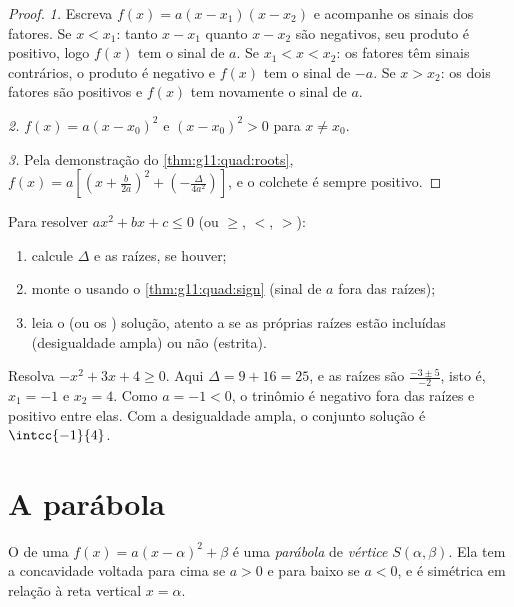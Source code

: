 \begin{proof}
\emph{1.} Escreva $f(x) = a(x-x_1)(x-x_2)$ e acompanhe os sinais dos
fatores. Se $x < x_1$: tanto $x - x_1$ quanto $x - x_2$ são negativos,
seu produto é positivo, logo $f(x)$ tem o sinal de $a$. Se
$x_1 < x < x_2$: os fatores têm sinais contrários, o produto é negativo e
$f(x)$ tem o sinal de $-a$. Se $x > x_2$: os dois fatores são positivos e
$f(x)$ tem novamente o sinal de $a$.

\emph{2.} $f(x) = a(x - x_0)^2$ e $(x-x_0)^2 > 0$ para $x \neq x_0$.

\emph{3.} Pela demonstração do \cref{thm:g11:quad:roots},
$f(x) = a\left[\left(x + \frac{b}{2a}\right)^2 +
\left(-\frac{\Delta}{4a^2}\right)\right]$, e o colchete é sempre
positivo.
\end{proof}

\begin{method}\label{met:g11:quad:inequalities}
Para resolver $ax^2 + bx + c \leq 0$ (ou $\geq$, $<$, $>$):
\begin{enumerate}
  \item calcule $\Delta$ e as raízes, se houver;
  \item monte o  usando o \cref{thm:g11:quad:sign} (sinal
        de $a$ fora das raízes);
  \item leia o  (ou os ) solução, atento a se as
        próprias raízes estão incluídas (desigualdade ampla) ou não
        (estrita).
\end{enumerate}
\end{method}

\begin{example}\label{ex:g11:quad:inequality}
Resolva $-x^2 + 3x + 4 \geq 0$. Aqui $\Delta = 9 + 16 = 25$, e as raízes
são $\frac{-3 \pm 5}{-2}$, isto é, $x_1 = -1$ e $x_2 = 4$. Como
$a = -1 < 0$, o trinômio é negativo fora das raízes e positivo entre
elas. Com a desigualdade ampla, o conjunto solução é $\intcc{-1}{4}$.
\end{example}

\section{A parábola}

\begin{definition}[Parábola]\label{def:g11:quad:parabola}
O  de uma  $f(x) = a(x-\alpha)^2+\beta$ é uma
\emph{parábola} de \emph{vértice} $S(\alpha, \beta)$. Ela
tem a concavidade voltada para cima se $a > 0$ e para baixo se $a < 0$, e
é simétrica em relação à reta vertical $x = \alpha$.
\end{definition}


